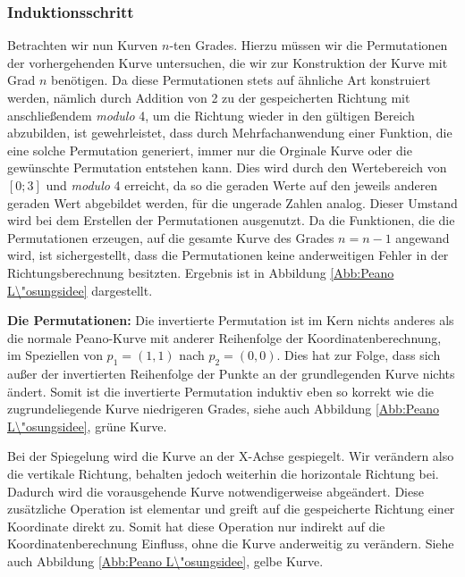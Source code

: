 \documentclass[course=asp]{aspdoc}
\begin{document}
\subsubsection{Induktionsschritt} \label{Induktionsschritt}
Betrachten wir nun Kurven $n$-ten Grades. Hierzu m\"ussen wir die Permutationen der vorhergehenden Kurve untersuchen, die wir zur Konstruktion der Kurve mit Grad $n$ ben\"otigen.
Da diese Permutationen stets auf \"ahnliche Art konstruiert werden, n\"amlich durch Addition von 2 zu der gespeicherten Richtung mit anschlie\ss endem \textit{modulo} 4, um die Richtung wieder in den g\"ultigen Bereich abzubilden, ist gewehrleistet, dass durch Mehrfachanwendung einer Funktion, die eine solche Permutation generiert, immer nur die Orginale Kurve oder die gew\"unschte Permutation entstehen kann. Dies wird durch den Wertebereich von $[0;3]$ und \textit{modulo} 4 erreicht, da so die geraden Werte auf den jeweils anderen geraden Wert abgebildet werden, f\"ur die ungerade Zahlen analog. Dieser Umstand wird bei dem Erstellen der Permutationen ausgenutzt.
Da die Funktionen, die die Permutationen erzeugen, auf die gesamte Kurve des Grades $n = n - 1$ angewand wird, ist sichergestellt, dass die Permutationen keine anderweitigen Fehler in der Richtungsberechnung besitzten. Ergebnis ist in Abbildung \ref{Abb:Peano L\"osungsidee} dargestellt.

\textbf{Die Permutationen: }%
Die invertierte Permutation ist im Kern nichts anderes als die normale Peano-Kurve mit anderer Reihenfolge der Koordinatenberechnung, im Speziellen von $p_1=(1,1)$ nach $p_2 = (0,0)$. Dies hat zur Folge, dass sich au\ss er der invertierten Reihenfolge der Punkte an der grundlegenden Kurve nichts \"andert. Somit ist die invertierte Permutation induktiv eben so korrekt wie die zugrundeliegende Kurve niedrigeren Grades, siehe auch Abbildung \ref{Abb:Peano L\"osungsidee}, gr\"une Kurve.

Bei der Spiegelung wird die Kurve an der X-Achse gespiegelt. Wir ver\"andern also die vertikale Richtung, behalten jedoch weiterhin die horizontale Richtung bei. Dadurch wird die vorausgehende Kurve notwendigerweise abge\"andert. Diese zus\"atzliche Operation ist elementar und greift auf die gespeicherte Richtung einer Koordinate direkt zu. Somit hat diese Operation nur indirekt auf die Koordinatenberechnung Einfluss, ohne die Kurve anderweitig zu ver\"andern. Siehe auch Abbildung \ref{Abb:Peano L\"osungsidee}, gelbe Kurve. %
\end{document}
